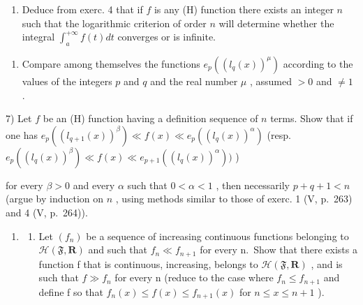 \begin{enumerate}
\def\labelenumi{\alph{enumi})}
\setcounter{enumi}{1}
\tightlist
\item
  Deduce from exerc. 4 that if \(f\) is any (H) function there exists an integer \(n\) such that the logarithmic criterion of order \(n\) will determine whether the integral \(\int_{a}^{+\infty} f(t) dt\) converges or is infinite.
\end{enumerate}

\begin{enumerate}
\def\labelenumi{\arabic{enumi})}
\setcounter{enumi}{5}
\tightlist
\item
  Compare among themselves the functions \(e_p\left((l_q(x))^{\mu}\right)\) according to the values of the integers \(p\) and \(q\) and the real number \(\mu\) , assumed \(> 0\) and \(\neq 1\) .
\end{enumerate}

7) Let \(f\) be an (H) function having a definition sequence of \(n\) terms. Show that if one has \(e_p((l_{q+1}(x))^{\beta}) \ll f(x) \ll e_p((l_q(x))^{\alpha})\) (resp. \(e_p((l_q(x))^{\beta}) \ll f(x) \ll e_{p+1}((l_q(x))^{\alpha}))\) )

for every \(\beta > 0\) and every \(\alpha\) such that \(0 < \alpha < 1\) , then necessarily \(p + q + 1 < n\) (argue by induction on \(n\) , using methods similar to those of exerc. 1 (V, p.~263) and 4 (V, p.~264)).

\begin{enumerate}
\def\labelenumi{\arabic{enumi})}
\setcounter{enumi}{7}
\tightlist
\item
  \begin{enumerate}
  \def\labelenumii{\alph{enumii})}
  \tightlist
  \item
    Let \((f_{n})\) be a sequence of increasing continuous functions belonging to \(\mathcal{H}(\mathfrak{F},\mathbf{R})\) and such that \(f_{n} \ll f_{n+1}\) for every n.~Show that there exists a function f that is continuous, increasing, belongs to \(\mathcal{H}(\mathfrak{F},\mathbf{R})\) , and is such that \(f \gg f_{n}\) for every n (reduce to the case where \(f_{n} \leqslant f_{n+1}\) and define f so that \(f_{n}(x) \leqslant f(x) \leqslant f_{n+1}(x)\) for \(n \leqslant x \leqslant n+1\) ).
  \end{enumerate}
\end{enumerate}

